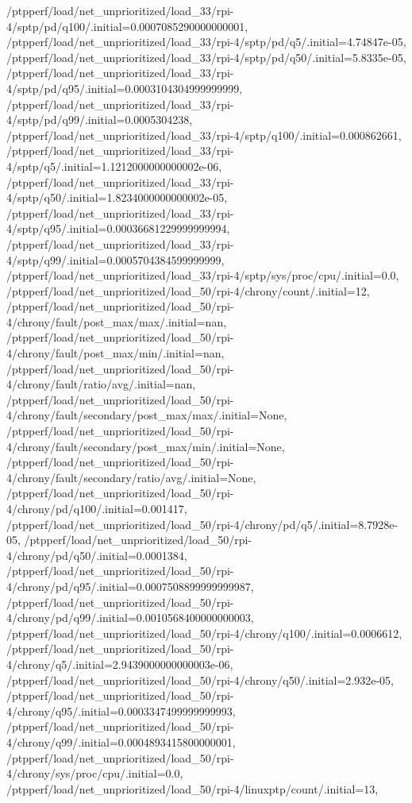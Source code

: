 {    /ptpperf/load/net_unprioritized/load_33/rpi-4/sptp/pd/q100/.initial=0.0007085290000000001,
    /ptpperf/load/net_unprioritized/load_33/rpi-4/sptp/pd/q5/.initial=4.74847e-05,
    /ptpperf/load/net_unprioritized/load_33/rpi-4/sptp/pd/q50/.initial=5.8335e-05,
    /ptpperf/load/net_unprioritized/load_33/rpi-4/sptp/pd/q95/.initial=0.0003104304999999999,
    /ptpperf/load/net_unprioritized/load_33/rpi-4/sptp/pd/q99/.initial=0.0005304238,
    /ptpperf/load/net_unprioritized/load_33/rpi-4/sptp/q100/.initial=0.000862661,
    /ptpperf/load/net_unprioritized/load_33/rpi-4/sptp/q5/.initial=1.1212000000000002e-06,
    /ptpperf/load/net_unprioritized/load_33/rpi-4/sptp/q50/.initial=1.8234000000000002e-05,
    /ptpperf/load/net_unprioritized/load_33/rpi-4/sptp/q95/.initial=0.00036681229999999994,
    /ptpperf/load/net_unprioritized/load_33/rpi-4/sptp/q99/.initial=0.0005704384599999999,
    /ptpperf/load/net_unprioritized/load_33/rpi-4/sptp/sys/proc/cpu/.initial=0.0,
    /ptpperf/load/net_unprioritized/load_50/rpi-4/chrony/count/.initial=12,
    /ptpperf/load/net_unprioritized/load_50/rpi-4/chrony/fault/post_max/max/.initial=nan,
    /ptpperf/load/net_unprioritized/load_50/rpi-4/chrony/fault/post_max/min/.initial=nan,
    /ptpperf/load/net_unprioritized/load_50/rpi-4/chrony/fault/ratio/avg/.initial=nan,
    /ptpperf/load/net_unprioritized/load_50/rpi-4/chrony/fault/secondary/post_max/max/.initial=None,
    /ptpperf/load/net_unprioritized/load_50/rpi-4/chrony/fault/secondary/post_max/min/.initial=None,
    /ptpperf/load/net_unprioritized/load_50/rpi-4/chrony/fault/secondary/ratio/avg/.initial=None,
    /ptpperf/load/net_unprioritized/load_50/rpi-4/chrony/pd/q100/.initial=0.001417,
    /ptpperf/load/net_unprioritized/load_50/rpi-4/chrony/pd/q5/.initial=8.7928e-05,
    /ptpperf/load/net_unprioritized/load_50/rpi-4/chrony/pd/q50/.initial=0.0001384,
    /ptpperf/load/net_unprioritized/load_50/rpi-4/chrony/pd/q95/.initial=0.0007508899999999987,
    /ptpperf/load/net_unprioritized/load_50/rpi-4/chrony/pd/q99/.initial=0.0010568400000000003,
    /ptpperf/load/net_unprioritized/load_50/rpi-4/chrony/q100/.initial=0.0006612,
    /ptpperf/load/net_unprioritized/load_50/rpi-4/chrony/q5/.initial=2.9439000000000003e-06,
    /ptpperf/load/net_unprioritized/load_50/rpi-4/chrony/q50/.initial=2.932e-05,
    /ptpperf/load/net_unprioritized/load_50/rpi-4/chrony/q95/.initial=0.0003347499999999993,
    /ptpperf/load/net_unprioritized/load_50/rpi-4/chrony/q99/.initial=0.0004893415800000001,
    /ptpperf/load/net_unprioritized/load_50/rpi-4/chrony/sys/proc/cpu/.initial=0.0,
    /ptpperf/load/net_unprioritized/load_50/rpi-4/linuxptp/count/.initial=13,
}
